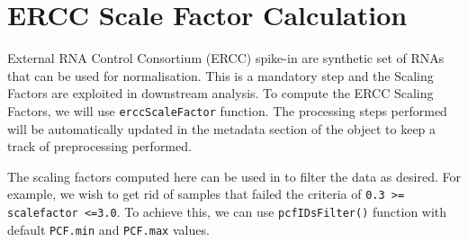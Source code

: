 \documentclass[]{article}
\newcommand{\hlstr}[1]{\textcolor[rgb]{0.251,0.627,0.251}{#1}}%
\newcommand{\hlcom}[1]{\textcolor[rgb]{0.502,0.502,0.502}{\textit{#1}}}%
\newcommand{\hlstd}[1]{\textcolor[rgb]{0.251,0.251,0.251}{#1}}%
\newenvironment{Shaded}{\begin{myshaded}}{\end{myshaded}}
\newcommand{\SpecialCharTok}[1]{\hlstr{#1}}
\newcommand{\CommentTok}[1]{\hlcom{#1}}
\newcommand{\OtherTok}[1]{{#1}}
\newcommand{\FunctionTok}[1]{\hlstd{#1}}
\newcommand{\NormalTok}[1]{\hlstd{#1}}
\begin{document}
\hypertarget{ercc-scale-factor-calculation}{%
\section{ERCC Scale Factor Calculation}\label{ercc-scale-factor-calculation}}

External RNA Control Consortium (ERCC) spike-in are synthetic set of RNAs that
can be used for normalisation. This is a mandatory step and the Scaling Factors
are exploited in downstream analysis. To compute the ERCC Scaling Factors, we
will use \texttt{erccScaleFactor} function.
The processing steps performed will be automatically updated in the metadata
section of the object to keep a track of preprocessing performed.

\begin{Shaded}
\end{Shaded}

The scaling factors computed here can be used in to filter the data as desired.
For example, we wish to get rid of samples that failed the criteria of
\texttt{0.3 \textgreater{}= scalefactor \textless{}=3.0}. To achieve this, we can use \texttt{pcfIDsFilter()}
function with default \texttt{PCF.min} and \texttt{PCF.max} values.
\end{document}
